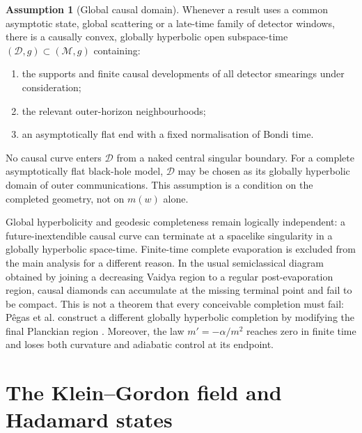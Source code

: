 \documentclass[11pt,a4paper]{article}
\theoremstyle{definition}
\newtheorem{assumption}[theorem]{Assumption}
\theoremstyle{remark}
\newcommand{\M}{\mathcal M}
\newcommand{\D}{\mathcal D}
\begin{document}
	\begin{assumption}[Global causal domain]
		\label{ass:causal-domain}
		Whenever a result uses a common asymptotic state, global scattering or a
		late-time family of detector windows, there is a causally convex, globally
		hyperbolic open subspace-time $(\D,g)\subset(\M,g)$ containing:
		\begin{enumerate}[label=(\roman*)]
			\item the supports and finite causal developments of all detector smearings
			under consideration;
			\item the relevant outer-horizon neighbourhoods;
			\item an asymptotically flat end with a fixed normalisation of Bondi time.
		\end{enumerate}
		No causal curve enters $\D$ from a naked central singular boundary.  For a
		complete asymptotically flat black-hole model, $\D$ may be chosen as its
		globally hyperbolic domain of outer communications.  This assumption is a
		condition on the completed geometry, not on $m(w)$ alone.
	\end{assumption}
	
	Global hyperbolicity and geodesic completeness remain logically independent:
	a future-inextendible causal curve can terminate at a spacelike singularity
	in a globally hyperbolic space-time.  Finite-time complete evaporation is
	excluded from the main analysis for a different reason.  In the usual
	semiclassical diagram obtained by joining a decreasing Vaidya region to a
	regular post-evaporation region, causal diamonds can accumulate at the
	missing terminal point and fail to be compact.  This is not a theorem that
	every conceivable completion must fail: P\^egas et al. construct a different
	globally hyperbolic completion by modifying the final Planckian region
	\cite{PegasEtAl2025}.  Moreover, the law $m'=-\alpha/m^2$ reaches zero in
	finite time and loses both curvature and adiabatic control at its endpoint.
	
	\section{The Klein--Gordon field and Hadamard states}
	\label{sec:AQFT}
	
\end{document}
